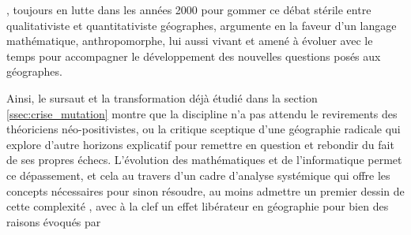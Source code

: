
\textcite{Sheppard2001}, toujours en lutte dans les années 2000 pour gommer ce débat stérile entre qualitativiste et quantitativiste géographes, argumente en la faveur d'un langage mathématique, anthropomorphe, lui aussi vivant et amené à évoluer avec le temps pour accompagner le développement des nouvelles questions posés aux géographes. 


Ainsi, le sursaut et la transformation déjà étudié dans la section \ref{ssec:crise_mutation} montre que la discipline n'a pas attendu le revirements des théoriciens néo-positivistes, ou la critique sceptique d'une géographie radicale qui explore d'autre horizons explicatif pour remettre en question et rebondir du fait de ses propres échecs. L'évolution des mathématiques et de l'informatique permet ce dépassement, et cela au travers d'un cadre d'analyse systémique qui offre les concepts nécessaires pour sinon résoudre, au moins admettre un premier dessin de cette complexité \autocite{Dauphine2003}, avec à la clef un effet libérateur en géographie pour bien des raisons évoqués par \textcite[137]{Pumain2002} \textcite[27-28]{Pumain2003}



